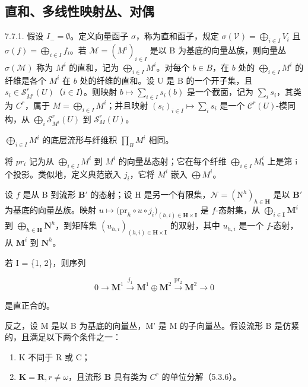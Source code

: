 \subsection{直和、多线性映射丛、对偶}

7.7.1. 假设 \(I_{-} = \emptyset\)。定义向量函子 \(\sigma\)，称为直和函子，规定 \(\sigma(\mathcal{V}) = \bigoplus_{i \in I} V_i\) 且 \(\sigma(f) = \bigoplus_{i \in I} f_i\)。若 \(\mathcal{M} = (M^i)_{i \in I}\) 是以 B 为基底的向量丛族，则向量丛 \(\sigma(\mathcal{M})\) 称为 \(M^i\) 的直和，记为 \(\bigoplus_{i \in I} M^i\)。对每个 \(b \in B\)，在 \(b\) 处的 \(\bigoplus_{i \in I} M^i\) 的纤维是各个 \(M^i\) 在 \(b\) 处的纤维的直和。设 U 是 B 的一个开子集，且 \(s_i \in \mathscr{S}_{M^i}^r(U)\)（\(i \in I\)）。则映射 \(b \mapsto \sum_{i \in I} s_i(b)\) 是一个截面，记为 \(\sum_{i} s_i\)，其类为 \(C^r\)，属于 \(M = \bigoplus_{i \in I} M^i\)；并且映射 \((s_i)_{i \in I} \mapsto \sum_{i} s_i\) 是一个 \(\mathscr{C}^r(U)\)-模同构，从 \(\bigoplus_{i} \mathscr{S}_{M^i}^r(U)\) 到 \(\mathscr{S}_M^r(U)\)。

\(\bigoplus_{i\in I}M^{i}\) 的底层流形与纤维积 \(\prod_{B}M^{i}\) 相同。

将 \(pr_{i}\) 记为从 \(\bigoplus_{i\in I} M^{i}\) 到 \(M^{i}\) 的向量丛态射；它在每个纤维 \(\bigoplus_{i\in I} M_{b}^{i}\) 上是第 i 个投影。类似地，定义典范嵌入 \(j_{i}\)，它将 \(M^{i}\) 嵌入 \(\bigoplus M^{i}\)。

设 \(f\) 是从 B 到流形 \(\mathbf{B}'\) 的态射；设 H 是另一个有限集，\(\mathcal{N} = (\mathrm{N}^{h})_{h\in \mathbf{H}}\) 是以 \(\mathbf{B}'\) 为基底的向量丛族。映射 \(u\mapsto \bigl(\mathrm{pr}_{h}\circ u\circ j_{i}\bigr)_{(h,i)\in \mathbf{H}\times \mathbf{I}}\) 是 \(f\)-态射集，从 \(\bigoplus_{i\in \mathbf{I}}\mathbf{M}^i\) 到 \(\bigoplus_{h\in \mathbf{H}}\mathbf{N}^h\)，到矩阵集 \((u_{h,i})_{(h,i)\in \mathbf{H}\times \mathbf{I}}\) 的双射，其中 \(u_{h,i}\) 是一个 \(f\)-态射，从 \(\mathbf{M}^i\) 到 \(\mathbf{N}^h\)。

若 I = \{1, 2\}，则序列

\[
0 \to \mathbf {M}^{1} \xrightarrow{j_{1}} \mathbf {M}^{1} \oplus \mathbf {M}^{2} \stackrel{\mathrm{pr}_{2}}{\to} \mathbf {M}^{2} \to 0
\]

是直正合的。

反之，设 M 是以 B 为基底的向量丛，M' 是 M 的子向量丛。假设流形 B 是仿紧的，且满足以下两个条件之一：

\begin{enumerate}
\def\labelenumi{(\roman{enumi})}
\item
  K 不同于 R 或 C；
\item
  \(\mathbf{K} = \mathbf{R}, r \neq \omega\)，且流形 \(\mathbf{B}\) 具有类为 \(C^r\) 的单位分解（5.3.6）。
\end{enumerate}

